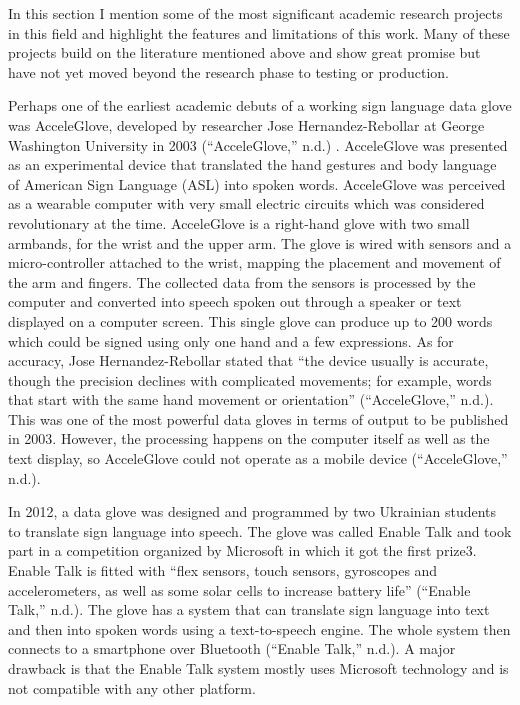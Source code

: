 In this section I mention some of the most significant academic research projects in this field and highlight the features and limitations of this work. Many of these projects build on the literature mentioned above and show great promise but have not yet moved beyond the research phase to testing or production.

Perhaps one of the earliest academic debuts of a working sign language data glove was AcceleGlove, developed by researcher Jose Hernandez-Rebollar at George Washington University in 2003 (``AcceleGlove,'' n.d.) . AcceleGlove was presented as an experimental device that translated the hand gestures and body language of American Sign Language (ASL) into spoken words. AcceleGlove was perceived as a wearable computer with very small electric circuits which was considered revolutionary at the time. AcceleGlove is a right-hand glove with two small armbands, for the wrist and the upper arm. The glove is wired with sensors and a micro-controller attached to the wrist, mapping the placement and movement of the arm and fingers. The collected data from the sensors is processed by the computer and converted into speech spoken out through a speaker or text displayed on a computer screen. This single glove can produce up to 200 words which could be signed using only one hand and a few expressions. As for accuracy, Jose Hernandez-Rebollar stated that ``the device usually is accurate, though the precision declines with complicated movements; for example, words that start with the same hand movement or orientation'' (``AcceleGlove,'' n.d.). This was one of the most powerful data gloves in terms of output to be published in 2003. However, the processing happens on the computer itself as well as the text display, so AcceleGlove could not operate as a mobile device (``AcceleGlove,'' n.d.). 


In 2012, a data glove was designed and programmed by two Ukrainian students to translate sign language into speech. The glove was called Enable Talk and took part in a competition organized by Microsoft in which it got the first prize3. Enable Talk is fitted with ``flex sensors, touch sensors, gyroscopes and accelerometers, as well as some solar cells to increase battery life'' (``Enable Talk,'' n.d.). The glove has a system that can translate sign language into text and then into spoken words using a text-to-speech engine. The whole system then connects to a smartphone over Bluetooth (``Enable Talk,'' n.d.). A major drawback is that the Enable Talk system mostly uses Microsoft technology and is not compatible with any other platform. 

